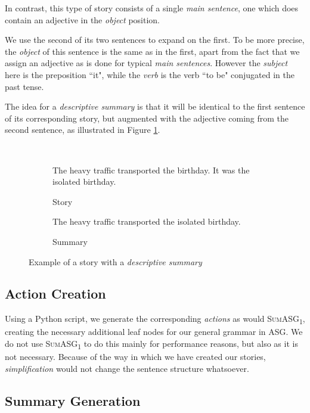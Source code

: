 In contrast, this type of story consists of a single \textit{main sentence}, one which does contain an adjective in the \textit{object} position.

We use the second of its two sentences to expand on the first. To be more precise, the \textit{object} of this sentence is the same as in the first, apart from the fact that we assign an adjective as is done for typical \textit{main sentences}. However the \textit{subject} here is the preposition ``it", while the \textit{verb} is the verb ``to be" conjugated in the past tense.

The idea for a \textit{descriptive summary} is that it will be identical to the first sentence of its corresponding story, but augmented with the adjective coming from the second sentence, as illustrated in Figure \ref{fig:descriptive_summary_example}.

\begin{figure}[H]\
\begin{subfigure}{\textwidth}
\begin{displayquote}
The heavy traffic transported the birthday. It was the isolated birthday.
\end{displayquote}
\caption{Story}
\vspace{\baselineskip}
\end{subfigure}
\begin{subfigure}{\textwidth}
\begin{displayquote}
The heavy traffic transported the isolated birthday.
\end{displayquote}
\caption{Summary}
\end{subfigure}
\caption{Example of a story with a \textit{descriptive summary}}
\label{fig:descriptive_summary_example}
\end{figure}

\subsection{Action Creation}

Using a Python script, we generate the corresponding \textit{actions} as would \textsc{SumASG\textsubscript{1}}, creating the necessary additional leaf nodes for our general grammar in ASG. We do not use \textsc{SumASG\textsubscript{1}} to do this mainly for performance reasons, but also as it is not necessary. Because of the way in which we have created our stories, \textit{simplification} would not change the sentence structure whatsoever.

\subsection{Summary Generation}

